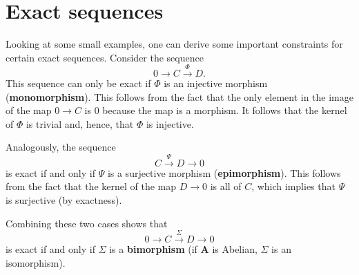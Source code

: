 \section{Exact sequences}


	\begin{property}
		Looking at some small examples, one can derive some important constraints for certain exact sequences. Consider the sequence \[0\longrightarrow C\overset{\Phi}{\longrightarrow}D.\] This sequence can only be exact if $\Phi$ is an injective morphism (\textbf{monomorphism}). This follows from the fact that the only element in the image of the map $0\rightarrow C$ is 0 because the map is a morphism. It follows that the kernel of $\Phi$ is trivial and, hence, that $\Phi$ is injective.

		Analogously, the sequence \[C\overset{\Psi}{\longrightarrow}D\longrightarrow0\] is exact if and only if $\Psi$ is a surjective morphism (\textbf{epimorphism}). This follows from the fact that the kernel of the map $D\rightarrow0$ is all of $C$, which implies that $\Psi$ is surjective (by exactness).

		Combining these two cases shows that \[0\longrightarrow C\overset{\Sigma}{\longrightarrow}D\longrightarrow0\] is exact if and only if $\Sigma$ is a \textbf{bimorphism} (if $\mathbf{A}$ is Abelian, $\Sigma$ is an isomorphism).
	\end{property}

